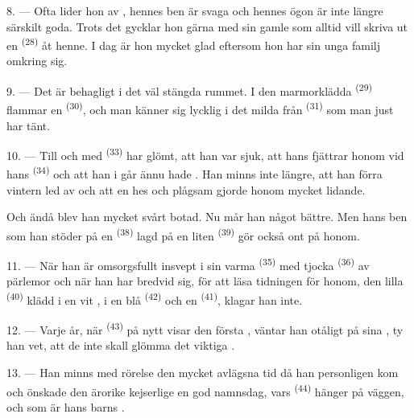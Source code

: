 8. --- Ofta lider hon av ,
hennes ben är svaga och hennes ögon är inte längre särskilt goda. Trots det
gycklar hon gärna med sin gamle  som alltid vill skriva ut en
 \textsuperscript{(28)} åt henne. I dag är hon mycket glad
eftersom hon har sin unga familj omkring sig.

9. --- Det är behagligt i det väl stängda rummet. I den marmorklädda
 \textsuperscript{(29)} flammar en 
\textsuperscript{(30)}, och man känner sig lycklig i det milda 
från  \textsuperscript{(31)} som man just har tänt.

\VUsaut{4.2mm}
\VUsaut{3.0mm}

10. --- Till och med  \textsuperscript{(33)} har glömt, att
han var sjuk, att hans  fjättrar honom vid hans
 \textsuperscript{(34)} och att han i går ännu hade . Han minns inte längre, att han förra vintern led av
 och att en hes och plågsam  gjorde honom
mycket lidande.

Och ändå blev han mycket svårt botad. Nu mår han något bättre. Men hans ben som
han stöder på en  \textsuperscript{(38)} lagd på en liten
 \textsuperscript{(39)} gör också ont på honom.

11. --- När han är omsorgsfullt insvept i sin varma 
\textsuperscript{(35)} med tjocka  \textsuperscript{(36)} av
pärlemor och när han har bredvid sig, för att läsa tidningen för honom, den
lilla  \textsuperscript{(40)} klädd i en vit
, i en blå  \textsuperscript{(42)} och en
 \textsuperscript{(41)}, klagar han inte.

12. --- Varje år, när  \textsuperscript{(43)} på nytt visar
 den första , väntar han otåligt på sina
, ty han vet, att de inte skall glömma det viktiga
.

13. --- Han minns med rörelse den mycket avlägsna tid då han personligen kom och
önskade den ärorike kejserlige  en god namnsdag, vars
 \textsuperscript{(44)} hänger på väggen, och som är hans barns
.
\VUsaut{6.0mm}
\VUfilet{22mm}
